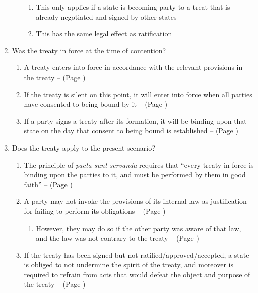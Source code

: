 \begin{enumerate}
\begin{enumerate}
\begin{enumerate}
            \item This only applies if a state is becoming party to a treat that is already negotiated and signed by other states
            \item This has the same legal effect as ratification
        \end{enumerate}
    \end{enumerate}
    \item Was the treaty in force at the time of contention?
    \begin{enumerate}
        \item A treaty enters into force in accordance with the relevant provisions in the treaty --  (Page \pageref{VCLT Art 24})
        \item If the treaty is silent on this point, it will enter into force when all parties have consented to being bound by it --  (Page \pageref{VCLT Art 24})
        \item If a party signs a treaty after its formation, it will be binding upon that state on the day that consent to being bound is established --  (Page \pageref{VCLT Art 24})
    \end{enumerate}
    \item Does the treaty apply to the present scenario?
    \begin{enumerate}
        \item The principle of \textit{pacta sunt servanda} requires that ``every treaty in force is binding upon the parties to it, and must be performed by them in good faith'' --  (Page \pageref{VCLT Art 26})
        \item A party may not invoke the provisions of its internal law as justification for failing to perform its obligations --  (Page \pageref{VCLT Art 27})
        \begin{enumerate}
            \item However, they may do so if the other party was aware of that law, and the law was not contrary to the treaty --  (Page \pageref{VCLT Art 46})
        \end{enumerate}
        \item If the treaty has been signed but not ratified/approved/accepted, a state is obliged to not undermine the spirit of the treaty, and moreover is required to refrain from acts that would defeat the object and purpose of the treaty --  (Page \pageref{VCLT Art 18})

\end{enumerate}
\end{enumerate}

